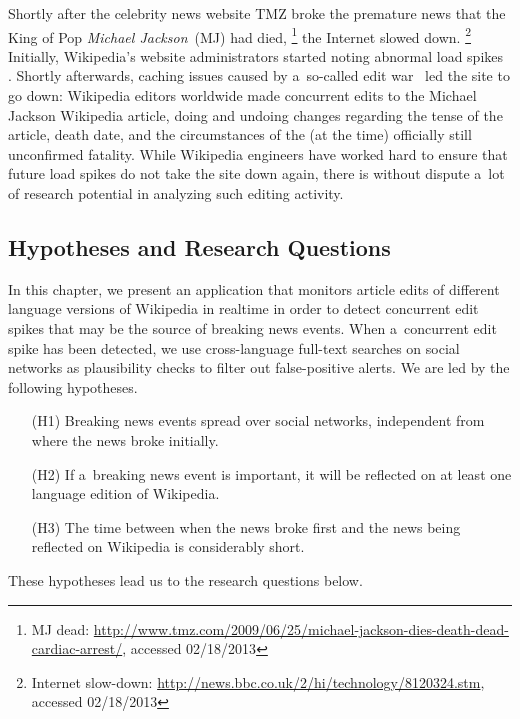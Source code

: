 Shortly after the celebrity news website TMZ
broke the premature news that the King of Pop \emph{Michael Jackson}~(MJ) had died,%
\footnote{MJ dead: \url{http://www.tmz.com/2009/06/25/michael-jackson-dies-death-dead-cardiac-arrest/},
accessed 02/18/2013}
the Internet slowed down.%
\footnote{Internet slow-down: \url{http://news.bbc.co.uk/2/hi/technology/8120324.stm},
accessed 02/18/2013}
Initially, Wikipedia's website administrators started noting abnormal load spikes~%
\cite{vibber2009currentevents}. Shortly afterwards, caching issues
caused by a~so-called edit war~\cite{beaumont2009editwar} led the site to go down:
Wikipedia editors worldwide made concurrent edits
to the Michael Jackson Wikipedia article, doing and undoing changes
regarding the tense of the article, death date,
and the circumstances of the (at the time) officially still unconfirmed fatality.
While Wikipedia engineers have worked hard
to ensure that future load spikes
do not take the site down again, there is without dispute a~lot of research potential
in analyzing such editing activity.

\subsection{Hypotheses and Research Questions}
\label{sec:hypotheses-and-research-questions}

In this chapter, we present an application that monitors article edits
of different language versions of Wikipedia in realtime
in order to detect concurrent edit spikes that may be the source of
breaking news events.
When a~concurrent edit spike has been detected,
we use cross-language full-text searches on social networks
as plausibility checks to filter out false-positive alerts.
We are led by the following hypotheses.

\begin{itemize}
  \itemsep0em
  \item[(H1)] Breaking news events spread over social networks,
    independent from where the news broke initially.
  \item[(H2)] If a~breaking news event is important, it will be reflected on
    at least one language edition of Wikipedia.
  \item[(H3)] The time between when the news broke first and the news
    being reflected on Wikipedia is considerably short.   
\end{itemize}

\noindent These hypotheses lead us to the research questions below.

